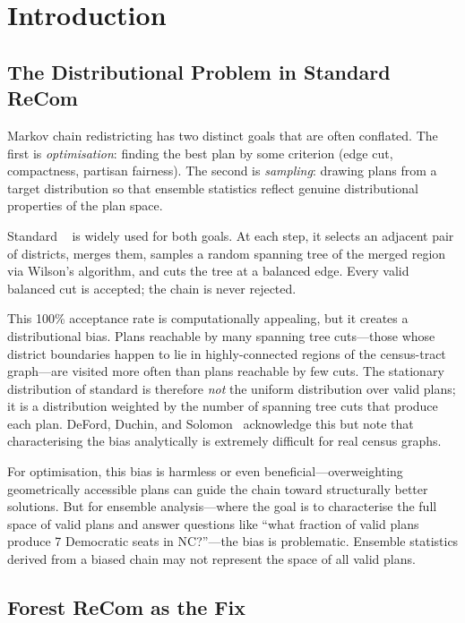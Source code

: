 \section{Introduction}
\label{sec:introduction}

\subsection{The Distributional Problem in Standard ReCom}

Markov chain redistricting has two distinct goals that are often conflated.
The first is \emph{optimisation}: finding the best plan by some criterion
(edge cut, compactness, partisan fairness).
The second is \emph{sampling}: drawing plans from a target distribution so
that ensemble statistics reflect genuine distributional properties of the
plan space.

Standard \recom{}~\citep{deford2021} is widely used for both goals.
At each step, it selects an adjacent pair of districts, merges them, samples
a random spanning tree of the merged region via Wilson's algorithm, and cuts
the tree at a balanced edge.
Every valid balanced cut is accepted; the chain is never rejected.

This 100\% acceptance rate is computationally appealing, but it creates
a distributional bias.
Plans reachable by many spanning tree cuts---those whose district boundaries
happen to lie in highly-connected regions of the census-tract graph---are
visited more often than plans reachable by few cuts.
The stationary distribution of standard \recom{} is therefore \emph{not} the
uniform distribution over valid plans; it is a distribution weighted by the
number of spanning tree cuts that produce each plan.
DeFord, Duchin, and Solomon~\citep{deford2021} acknowledge this but note that
characterising the bias analytically is extremely difficult for real census
graphs.

For optimisation, this bias is harmless or even beneficial---overweighting
geometrically accessible plans can guide the chain toward structurally better
solutions.
But for ensemble analysis---where the goal is to characterise the full space
of valid plans and answer questions like ``what fraction of valid plans
produce 7 Democratic seats in NC?''---the bias is problematic.
Ensemble statistics derived from a biased chain may not represent the space
of all valid plans.

\subsection{Forest ReCom as the Fix}

